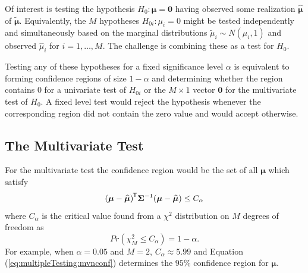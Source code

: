 \documentclass[letterpaper,12pt,oneside,final]{article}
\newcommand{\ve}[1]{\mathbf{#1}}           %
\newcommand{\sv}[1]{\boldsymbol{#1}}   %
\newcommand{\sm}[1]{\boldsymbol{#1}}   %
\newcommand{\tr}[1]{{#1}^{\mkern-1.5mu\mathsf{T}}}              %
\newcommand{\bigwig}[1]{\widetilde{#1}}
\newcommand{\follows}{\sim}
\begin{document}
Of interest is testing the hypothesis $H_0: \sv{\mu} = \ve{0}$ having observed some realization $\widehat{\sv{\mu}}$ of $\bigwig{\sv{\mu}}$.  Equivalently, the $M$ hypotheses $H_{0i}: \mu_i = 0$ might be tested independently and simultaneously based on the marginal distributions $\bigwig{\mu}_i \follows N(\mu_i, 1)$ and observed $\widehat{\mu}_i$ for $i = 1, \ldots, M$.  The challenge is combining these as a test for $H_0$.

Testing any of these hypotheses for a fixed significance level $\alpha$ is equivalent to forming confidence regions of size $1 - \alpha$ and determining whether the region contains 0 for a univariate test of $H_{0i}$ or the $M \times 1$ vector $\ve{0}$ for the multivariate test of $H_0$.   A fixed level test would reject the hypothesis whenever the corresponding region did not contain the zero value and would accept otherwise.

\subsection{The Multivariate Test}
For the multivariate test the confidence region would be the set of all $\sv{\mu}$  which satisfy
\begin{equation}
\tr{(\sv{\mu} - \widehat{\sv{\mu}})} {\sm{\Sigma}}^{-1} (\sv{\mu} - \widehat{\sv{\mu}}) \le C_\alpha
\label{eq:multipleTesting:mvnconf}
\end{equation}
where $C_\alpha$ is the critical value found from a $\chi^2$ distribution on $M$ degrees of freedom as
\[ Pr(\chi_M^2 \le C_\alpha) = 1 - \alpha. \]
For example, when $\alpha = 0.05$ and $M =  2$,  $C_\alpha \approx 5.99$ and Equation (\ref{eq:multipleTesting:mvnconf}) determines the $95\%$ confidence region for $\sv{\mu}$.
\end{document}

